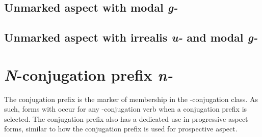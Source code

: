 \documentclass[12pt,letterpaper,landscape,oneside,article]{memoir}
\begin{document}
\clearpage
\subsection{Unmarked aspect with modal \textit{g̱-}}

\subsection{Unmarked aspect with irrealis \textit{u-} and modal \textit{g̱-}}

\clearpage
\section{\textit{N}-conjugation prefix \textit{n-}}

\begin{multicols}{2}
\noindent
The  conjugation prefix is the marker of membership in the -conjugation class.
As such, forms with  occur for any -conjugation verb when a conjugation prefix is selected.
The  conjugation prefix also has a dedicated use in progressive aspect forms, similar to how the  conjugation prefix is used for prospective aspect.
\end{multicols}
\end{document}
